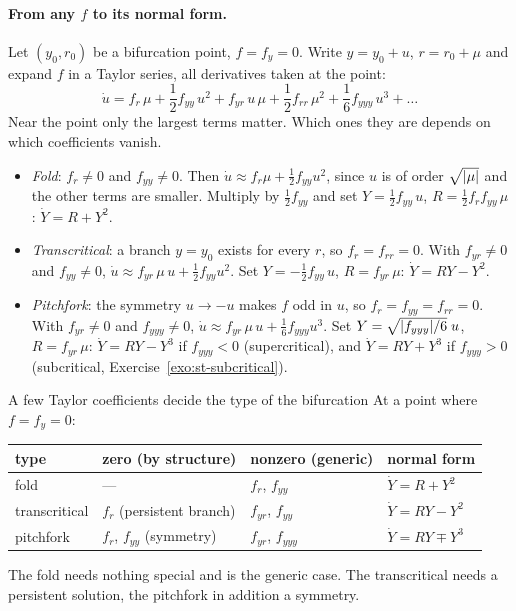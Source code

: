 \paragraph{From any $f$ to its normal form.}
%
Let $(y_0,r_0)$ be a bifurcation point, $f = f_y = 0$. Write $y = y_0 + u$,
$r = r_0 + \mu$ and expand $f$ in a Taylor series, all derivatives taken at the
point:
\begin{equation}\label{eq:st-taylor}
  \dot u = f_r\,\mu + \frac12 f_{yy}\,u^2 + f_{yr}\,u\,\mu
  + \frac12 f_{rr}\,\mu^2 + \frac16 f_{yyy}\,u^3 + \dots
\end{equation}
Near the point only the largest terms matter. Which ones they are depends on which
coefficients vanish.
\begin{itemize}
  \item \emph{Fold}: $f_r \neq 0$ and $f_{yy} \neq 0$. Then
        $\dot u \approx f_r\mu + \tfrac12 f_{yy}u^2$, since $u$ is of order
        $\sqrt{\lvert \mu\rvert}$ and the other terms are smaller. Multiply by $\tfrac12 f_{yy}$
        and set $Y = \tfrac12 f_{yy}\,u$, $R = \tfrac12 f_r f_{yy}\,\mu$:
        $\dot Y = R + Y^2$.
  \item \emph{Transcritical}: a branch $y = y_0$ exists for every $r$, so
        $f_r = f_{rr} = 0$. With $f_{yr} \neq 0$ and $f_{yy} \neq 0$,
        $\dot u \approx f_{yr}\,\mu\,u + \tfrac12 f_{yy}u^2$. Set
        $Y = -\tfrac12 f_{yy}\,u$, $R = f_{yr}\,\mu$: $\dot Y = RY - Y^2$.
  \item \emph{Pitchfork}: the symmetry $u \to -u$ makes $f$ odd in $u$, so
        $f_r = f_{yy} = f_{rr} = 0$. With $f_{yr} \neq 0$ and $f_{yyy} \neq 0$,
        $\dot u \approx f_{yr}\,\mu\,u + \tfrac16 f_{yyy}u^3$. Set
        $Y = \sqrt{\lvert f_{yyy}\rvert/6}\;u$, $R = f_{yr}\,\mu$:
        $\dot Y = RY - Y^3$ if $f_{yyy} < 0$ (supercritical), and
        $\dot Y = RY + Y^3$ if $f_{yyy} > 0$ (subcritical,
        Exercise~\ref{exo:st-subcritical}).
\end{itemize}

\begin{gbox}{A few Taylor coefficients decide the type of the bifurcation}\label{sec:st-reduction}
%
At a point where $f = f_y = 0$:
\begin{center}
\begin{tabular}{@{}llll@{}}
  \toprule
  type & zero (by structure) & nonzero (generic) & normal form \\
  \midrule
  fold          & ---                         & $f_r$, $f_{yy}$    & $\dot Y = R + Y^2$ \\
  transcritical & $f_r$ (persistent branch)   & $f_{yr}$, $f_{yy}$  & $\dot Y = RY - Y^2$ \\
  pitchfork     & $f_r$, $f_{yy}$ (symmetry)  & $f_{yr}$, $f_{yyy}$ & $\dot Y = RY \mp Y^3$ \\
  \bottomrule
\end{tabular}
\end{center}
The fold needs nothing special and is the generic case. The transcritical needs a
persistent solution, the pitchfork in addition a symmetry.
\end{gbox}

